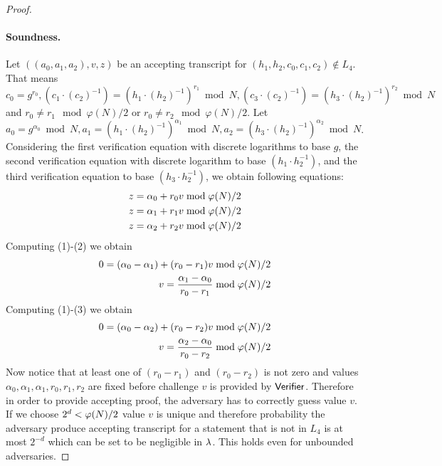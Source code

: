 \begin{proof}
\paragraph{Soundness.} Let $((a_0, a_1, a_2), v, z)$ be an accepting transcript for $(h_1, h_2, c_0, c_1, c_2) \notin L_4$. That means $c_0 = g^{r_0}, (c_1\cdot (c_2)^{-1}) = (h_1\cdot (h_2)^{-1})^{r_1} \bmod N, (c_3\cdot (c_2)^{-1}) = (h_3\cdot (h_2)^{-1})^{r_2} \bmod N$ and $r_0 \neq r_1 \mod \varphi(N)/2$ or $r_0 \neq r_2 \mod \varphi(N)/2$. Let $a_0 = g^{\alpha_0} \bmod N, a_1 = (h_1\cdot (h_2)^{-1})^{\alpha_1} \bmod N, a_2 = (h_3\cdot (h_2)^{-1})^{\alpha_2} \bmod N$. Considering the first verification equation with discrete logarithms to base $g$, the second verification equation with discrete logarithm to base $(h_1 \cdot h_2^{-1})$, and the third verification equation to base $(h_3 \cdot h_2^{-1})$, we obtain following equations:
\begin{align}
z = \alpha_0 + r_0 v \bmod \varphi(N)/2\\
z = \alpha_1 + r_1 v \bmod \varphi(N)/2 \\
z = \alpha_2 + r_2 v \bmod \varphi(N)/2
\end{align}
Computing (1)-(2) we obtain
\begin{align*}
0 = (\alpha_0 - \alpha_1)+ (r_0-r_1)v \bmod \varphi(N)/2 \\
v = \frac{\alpha_1 - \alpha_0}{r_0-r_1} \bmod \varphi(N)/2
\end{align*}
Computing (1)-(3) we obtain
\begin{align*}
0 = (\alpha_0 - \alpha_2)+ (r_0-r_2)v \bmod \varphi(N)/2 \\
v = \frac{\alpha_2 - \alpha_0}{r_0-r_2} \bmod \varphi(N)/2
\end{align*}
Now notice that at least one of $(r_0 - r_1)$ and $(r_0 - r_2)$ is not zero and values $\alpha_0, \alpha_1, \alpha_1, r_0, r_1, r_2$ are fixed before challenge $v$ is provided by $\mathsf{Verifier}$. Therefore in order to provide accepting proof, the adversary has to correctly guess value $v$. If we choose $2^d < \varphi(N)/2$ value $v$ is unique and therefore probability the adversary produce accepting transcript for a statement that is not in $L_4$ is at most $2^{-d}$ which can be set to be negligible in $\lambda$. This holds even for unbounded adversaries. 




\end{proof}
